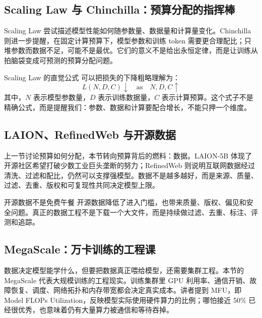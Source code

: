 \documentclass[a4paper]{article}
\begin{document}
\subsection{Scaling Law 与 Chinchilla：预算分配的指挥棒}

Scaling Law 尝试描述模型性能如何随参数量、数据量和计算量变化。Chinchilla 则进一步提醒，在固定计算预算下，模型参数和训练 token 需要更合理配比；只堆参数而数据不足，可能不是最优。它们的意义不是给出永恒定律，而是让训练从拍脑袋变成可预测的预算分配问题。

\begin{knowledgebox}{Scaling Law 的直觉公式}
可以把损失的下降粗略理解为：
\[
L(N, D, C) \downarrow \quad \text{as} \quad N,D,C \uparrow
\]
其中，\(N\) 表示模型参数量，\(D\) 表示训练数据量，\(C\) 表示计算预算。这个式子不是精确公式，而是提醒我们：参数、数据和计算要配合增长，不能只押一个维度。
\end{knowledgebox}

\subsection{LAION、RefinedWeb 与开源数据}

上一节讨论预算如何分配，本节转向预算背后的燃料：数据。LAION-5B 体现了开源社区希望打破少数工业巨头垄断的努力；RefinedWeb 则说明互联网数据经过清洗、过滤和配比，仍然可以支撑强模型。数据不是越多越好，而是来源、质量、过滤、去重、版权和可复现性共同决定模型上限。

\begin{warningbox}{开源数据不是免费午餐}
开源数据降低了进入门槛，也带来质量、版权、偏见和安全问题。真正的数据工程不是下载一个大文件，而是持续做过滤、去重、标注、评测和追踪。
\end{warningbox}

\subsection{MegaScale：万卡训练的工程课}

数据决定模型能学什么，但要把数据真正喂给模型，还需要集群工程。本节的 MegaScale 代表大规模训练的工程现实。训练集群里 GPU 利用率、通信开销、故障恢复、调度、网络拓扑和内存带宽都会决定真实成本。讲者提到 MFU，即 Model FLOPs Utilization，反映模型实际使用硬件算力的比例；哪怕接近 50\% 已经很优秀，也意味着仍有大量算力被通信和等待吞掉。
\end{document}
